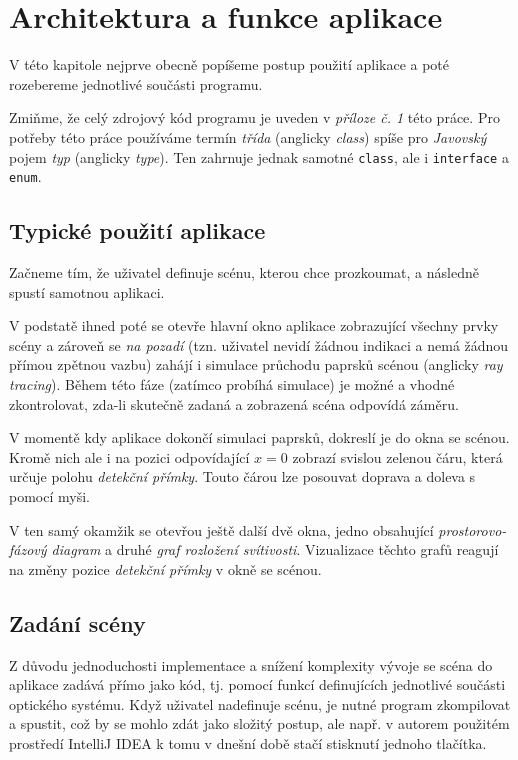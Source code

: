 \section{Architektura a funkce aplikace}

V této kapitole nejprve obecně popíšeme postup použití aplikace a poté rozebereme jednotlivé součásti programu.

Zmiňme, že celý zdrojový kód programu je uveden v \emph{příloze č. 1} této práce. Pro potřeby této práce používáme termín \emph{třída} (anglicky \emph{class}) spíše pro \emph{Javovský} pojem \emph{typ} (anglicky \emph{type}). Ten zahrnuje jednak samotné \texttt{class}, ale i \texttt{interface} a \texttt{enum}.

\subsection{Typické použití aplikace}

Začneme tím, že uživatel definuje scénu, kterou chce prozkoumat, a následně spustí samotnou aplikaci.

V podstatě ihned poté se otevře hlavní okno aplikace zobrazující všechny prvky scény a zároveň se \emph{na pozadí} (tzn. uživatel nevidí žádnou indikaci a nemá žádnou přímou zpětnou vazbu) zahájí i simulace průchodu paprsků scénou (anglicky \emph{ray tracing}). Během této fáze (zatímco probíhá simulace) je možné a vhodné zkontrolovat, zda-li skutečně zadaná a zobrazená scéna odpovídá záměru.

V momentě kdy aplikace dokončí simulaci paprsků, dokreslí je do okna se scénou. Kromě nich ale i na pozici odpovídající $ x = 0 $ zobrazí svislou zelenou čáru, která určuje polohu \emph{detekční přímky}. Touto čárou lze posouvat doprava a doleva s pomocí myši.

V ten samý okamžik se otevřou ještě další dvě okna, jedno obsahující \emph{prostorovo-fázový diagram} a druhé \emph{graf rozložení svítivosti}. Vizualizace těchto grafů reagují na změ\-ny pozice \emph{detekční přímky} v okně se scénou.

\subsection{Zadání scény}
\label{sub:architekturaaplikace_zadanisceny}

Z důvodu jednoduchosti implementace a snížení komplexity vývoje se scéna do aplikace zadává přímo jako kód, tj. pomocí funkcí definujících jednotlivé součásti optického systému. Když uživatel nadefinuje scénu, je nutné program zkompilovat a spustit, což by se mohlo zdát jako složitý postup, ale např. v autorem použitém prostředí IntelliJ IDEA k tomu v dnešní době stačí stisknutí jednoho tlačítka.

